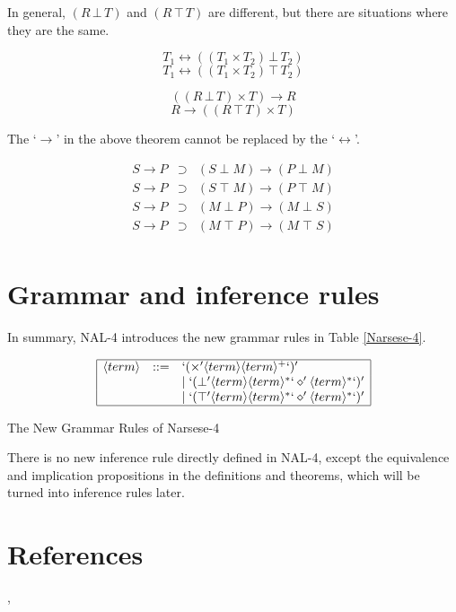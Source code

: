 In general, \((R \, \bot \, T)\) and \((R \, \top \, T)\) are different, but there are situations where they are the same.
\begin{theo}
\[T_1 \leftrightarrow ((T_1 \times T_2) \, \bot \, T_2)\]
\[T_1 \leftrightarrow ((T_1 \times T_2) \, \top \, T_2)\]
\end{theo}

\begin{theo}
\[((R \, \bot \, T) \times T) \rightarrow R\]
\[R \rightarrow ((R \, \top \, T) \times T)\] 
\end{theo}
The `$\rightarrow$' in the above theorem cannot be replaced by the `$\leftrightarrow$'.

\begin{theo}
\[\begin{array}{rcl}
S \rightarrow P
 & \supset & (S \; \bot \; M) \rightarrow (P \; \bot \; M)   \\
S \rightarrow P
 & \supset & (S \; \top \; M) \rightarrow (P \; \top \; M)   \\
S \rightarrow P
 & \supset & (M \; \bot \; P) \rightarrow (M \; \bot \; S)   \\
S \rightarrow P
 & \supset & (M \; \top \; P) \rightarrow (M \; \top \; S)   \\
\end{array} \]
\end{theo}

\section{Grammar and inference rules}

In summary, NAL-4 introduces the new grammar rules in Table \ref{Narsese-4}.

\begin{table}[htb]
\[\begin{array}{|rrl|}
\hline
\langle term \rangle & ::= & `(\times' \langle term \rangle \langle term \rangle ^+ `)' \\ &&
                     | \; `(\bot' \langle term \rangle \langle term \rangle ^* `\diamond' \langle term \rangle^* `)' \\ &&
                     | \; `(\top' \langle term \rangle \langle term \rangle ^* `\diamond' \langle term \rangle^* `)' \\
\hline
\end{array} \]
\caption{The New Grammar Rules of Narsese-4}
\label{Narsese-4}
\end{table}

There is no new inference rule directly defined in NAL-4, except the equivalence and implication propositions in the definitions and theorems, which will be turned into inference rules later.


\section*{References}

\cite[Chapter 4]{wp:book1}, \cite{wp:unify,wp:agi}

